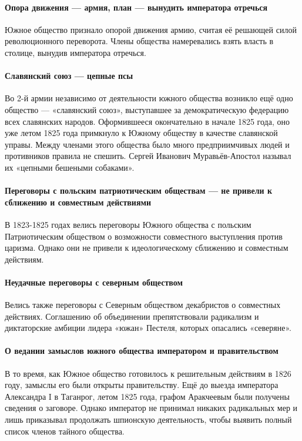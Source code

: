 \documentclass{article}
\begin{document}
\paragraph{Опора движения — армия, план — вынудить императора отречься}

Южное общество признало опорой движения армию, считая её решающей силой революционного переворота. Члены общества намеревались взять власть в столице, вынудив императора отречься.

\paragraph{Славянский союз — цепные псы}

Во 2-й армии независимо от деятельности южного общества возникло ещё одно общество — «славянский союз», выступавшее за демократическую федерацию всех славянских народов. Оформившееся окончательно в начале 1825 года, оно уже летом 1825 года примкнуло к Южному обществу в качестве славянской управы. Между членами этого общества было много предприимчивых людей и противников правила не спешить. Сергей Иванович Муравьёв-Апостол называл их «цепными бешеными собаками».

\paragraph{Переговоры с польским патриотическим обществам — не привели к сближению и совместным действиями}

В 1823-1825 годах велись переговоры Южного общества с польским Патриотическим обществом о возможности совместного выступления против царизма. Однако они не привели к идеологическому сближению и совместным действиям.

\paragraph{Неудачные переговоры с северным обществом}

Велись также переговоры с Северным обществом декабристов о совместных действиях. Соглашению об объединении препятствовали радикализм и диктаторские амбиции лидера «южан» Пестеля, которых опасались «северяне».

\paragraph{О ведании замыслов южного общества императором и правительством}

В то время, как Южное общество готовилось к решительным действиям в 1826 году, замыслы его были открыты правительству. Ещё до выезда императора Александра I в Таганрог, летом 1825 года, графом Аракчеевым были получены сведения о заговоре. Однако император не принимал никаких радикальных мер и лишь приказывал продолжать шпионскую деятельность, чтобы выявить полный список членов тайного общества.
\end{document}
